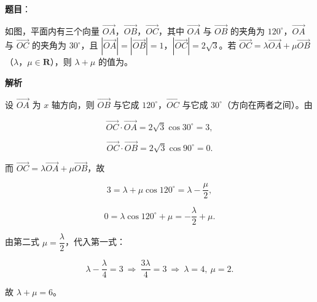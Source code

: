 \begin{answer}

\textbf{题目}：

如图，平面内有三个向量 $\overrightarrow{OA}$，$\overrightarrow{OB}$，$\overrightarrow{OC}$，其中 $\overrightarrow{OA}$ 与 $\overrightarrow{OB}$ 的夹角为 $120^\circ$，$\overrightarrow{OA}$ 与 $\overrightarrow{OC}$ 的夹角为 $30^\circ$，且 $|\overrightarrow{OA}|=|\overrightarrow{OB}|=1$，$|\overrightarrow{OC}|=2\sqrt3$。若 $\overrightarrow{OC}=\lambda\overrightarrow{OA}+\mu\overrightarrow{OB}$（$\lambda$，$\mu\in\mathbf R$），则 $\lambda+\mu$ 的值为\gkblank{}。
\nopagebreak[4]
\begin{center}\end{center}
\nopagebreak[4]
\textbf{解析}

设 $\overrightarrow{OA}$ 为 $x$ 轴方向，则 $\overrightarrow{OB}$ 与它成 $120^\circ$，$\overrightarrow{OC}$ 与它成 $30^\circ$（方向在两者之间）。由

\nopagebreak[4]
\[\overrightarrow{OC}\cdot\overrightarrow{OA}=2\sqrt3\cos30^\circ=3,\]

\nopagebreak[4]
\[\overrightarrow{OC}\cdot\overrightarrow{OB}=2\sqrt3\cos90^\circ=0.\]

而 $\overrightarrow{OC}=\lambda\overrightarrow{OA}+\mu\overrightarrow{OB}$，故

\nopagebreak[4]
\[3=\lambda+\mu\cos120^\circ=\lambda-\frac\mu2,\]

\nopagebreak[4]
\[0=\lambda\cos120^\circ+\mu=-\frac\lambda2+\mu.\]

由第二式 $\mu=\dfrac\lambda2$，代入第一式：

\nopagebreak[4]
\[\lambda-\frac\lambda4=3\ \Rightarrow\ \frac{3\lambda}4=3\ \Rightarrow\ \lambda=4,\ \mu=2.\]

故 $\lambda+\mu=6$。


\end{answer}
